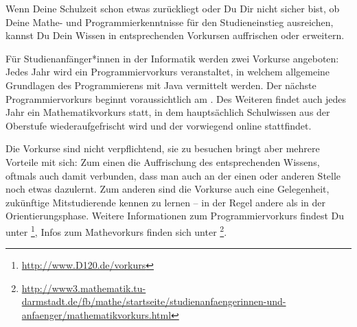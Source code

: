 {Wenn Deine Schulzeit schon etwas zurückliegt oder Du Dir nicht sicher bist, ob Deine Mathe- und Programmierkenntnisse für den Studieneinstieg ausreichen, kannst Du Dein Wissen in entsprechenden Vorkursen auffrischen oder erweitern.
}{Für Studienanfänger*innen in der Informatik werden zwei Vorkurse angeboten: Jedes Jahr wird ein Programmiervorkurs veranstaltet, in welchem allgemeine Grundlagen des Programmierens mit Java vermittelt werden. Der nächste Programmiervorkurs beginnt voraussichtlich am \vorkurs. Des Weiteren findet auch jedes Jahr ein Mathematikvorkurs statt, in dem hauptsächlich Schulwissen aus der Oberstufe wiederaufgefrischt wird und der vorwiegend online stattfindet.

    Die Vorkurse sind nicht verpflichtend, sie zu besuchen bringt aber mehrere Vorteile mit sich: Zum einen die Auffrischung des entsprechenden Wissens, oftmals auch damit verbunden, dass man auch an der einen oder anderen Stelle noch etwas dazulernt. Zum anderen sind die Vorkurse auch eine Gelegenheit, zukünftige Mitstudierende kennen zu lernen – in der Regel andere als in der Orientierungsphase.
    Weitere Informationen zum Programmiervorkurs findest Du unter \footnote{\url{http://www.D120.de/vorkurs}}, Infos zum Mathevorkurs finden sich unter \footnote{\url{http://www3.mathematik.tu-darmstadt.de/fb/mathe/startseite/studienanfaengerinnen-und-anfaenger/mathematikvorkurs.html}}.
}{}

\newpage
